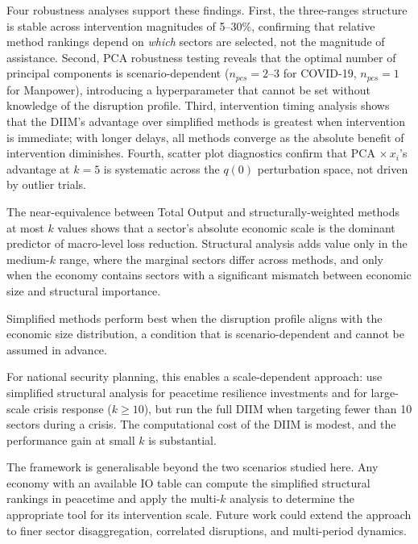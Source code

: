 Four robustness analyses support these findings. First, the three-ranges structure is stable across intervention magnitudes of 5--30\%, confirming that relative method rankings depend on \emph{which} sectors are selected, not the magnitude of assistance. Second, PCA robustness testing reveals that the optimal number of principal components is scenario-dependent ($n_{\textit{pcs}} = 2$--$3$ for COVID-19, $n_{\textit{pcs}} = 1$ for Manpower), introducing a hyperparameter that cannot be set without knowledge of the disruption profile. Third, intervention timing analysis shows that the DIIM's advantage over simplified methods is greatest when intervention is immediate; with longer delays, all methods converge as the absolute benefit of intervention diminishes. Fourth, scatter plot diagnostics confirm that PCA $\times\, x_i$'s advantage at $k = 5$ is systematic across the $q(0)$ perturbation space, not driven by outlier trials.

The near-equivalence between Total Output and structurally-weighted methods at most $k$ values shows that a sector's absolute economic scale is the dominant predictor of macro-level loss reduction. Structural analysis adds value only in the medium-$k$ range, where the marginal sectors differ across methods, and only when the economy contains sectors with a significant mismatch between economic size and structural importance.

Simplified methods perform best when the disruption profile aligns with the economic size distribution, a condition that is scenario-dependent and cannot be assumed in advance.

For national security planning, this enables a scale-dependent approach: use simplified structural analysis for peacetime resilience investments and for large-scale crisis response ($k \geq 10$), but run the full DIIM when targeting fewer than 10 sectors during a crisis. The computational cost of the DIIM is modest, and the performance gain at small $k$ is substantial.

The framework is generalisable beyond the two scenarios studied here. Any economy with an available IO table can compute the simplified structural rankings in peacetime and apply the multi-$k$ analysis to determine the appropriate tool for its intervention scale. Future work could extend the approach to finer sector disaggregation, correlated disruptions, and multi-period dynamics.

\newpage

